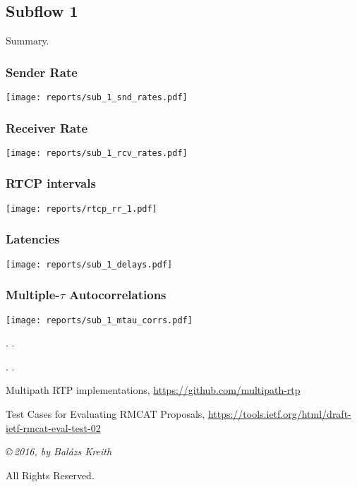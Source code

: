 \documentclass[a4paper]{article}
\begin{document}
\subsection{Subflow 1}
Summary.

\subsubsection{Sender Rate}
\texttt{[image: reports/sub\_1\_snd\_rates.pdf]}

\subsubsection{Receiver Rate}
\texttt{[image: reports/sub\_1\_rcv\_rates.pdf]}

\subsubsection{RTCP intervals}
\texttt{[image: reports/rtcp\_rr\_1.pdf]}

\subsubsection{Latencies}
\texttt{[image: reports/sub\_1\_delays.pdf]}

\subsubsection{Multiple-$\tau$ Autocorrelations}
\texttt{[image: reports/sub\_1\_mtau\_corrs.pdf]}



.
.



.
.


\begin{thebibliography}{9}
Multipath RTP implementations, \url{https://github.com/multipath-rtp}

Test Cases for Evaluating RMCAT Proposals, \url{https://tools.ietf.org/html/draft-ietf-rmcat-eval-test-02}

\end{thebibliography}

{%
   \vspace*{65mm}
   \thispagestyle{empty}
   \footnotesize\itshape
   \setlength{\parskip}{\baselineskip}
   \setlength{\parindent}{0pt}
   \copyright\,2016, by Balázs Kreith

   All Rights Reserved.
}%
\end{document}
